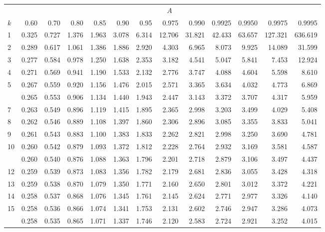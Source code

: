 \documentclass[
]{article}
\begin{document}
\begin{table}[H]
\centering
\begin{tabular}{lrrrrrrrrrrrr}
\toprule
\multicolumn{1}{c}{ } & \multicolumn{12}{c}{$A$} \\
\cmidrule(l{3pt}r{3pt}){2-13}
$k$ & 0.60 & 0.70 & 0.80 & 0.85 & 0.90 & 0.95 & 0.975 & 0.990 & 0.9925 & 0.9950 & 0.9975 & 0.9995\\
\midrule
1 & 0.325 & 0.727 & 1.376 & 1.963 & 3.078 & 6.314 & 12.706 & 31.821 & 42.433 & 63.657 & 127.321 & 636.619\\
2 & 0.289 & 0.617 & 1.061 & 1.386 & 1.886 & 2.920 & 4.303 & 6.965 & 8.073 & 9.925 & 14.089 & 31.599\\
3 & 0.277 & 0.584 & 0.978 & 1.250 & 1.638 & 2.353 & 3.182 & 4.541 & 5.047 & 5.841 & 7.453 & 12.924\\
4 & 0.271 & 0.569 & 0.941 & 1.190 & 1.533 & 2.132 & 2.776 & 3.747 & 4.088 & 4.604 & 5.598 & 8.610\\
5 & 0.267 & 0.559 & 0.920 & 1.156 & 1.476 & 2.015 & 2.571 & 3.365 & 3.634 & 4.032 & 4.773 & 6.869\\
\addlinespace
6 & 0.265 & 0.553 & 0.906 & 1.134 & 1.440 & 1.943 & 2.447 & 3.143 & 3.372 & 3.707 & 4.317 & 5.959\\
7 & 0.263 & 0.549 & 0.896 & 1.119 & 1.415 & 1.895 & 2.365 & 2.998 & 3.203 & 3.499 & 4.029 & 5.408\\
8 & 0.262 & 0.546 & 0.889 & 1.108 & 1.397 & 1.860 & 2.306 & 2.896 & 3.085 & 3.355 & 3.833 & 5.041\\
9 & 0.261 & 0.543 & 0.883 & 1.100 & 1.383 & 1.833 & 2.262 & 2.821 & 2.998 & 3.250 & 3.690 & 4.781\\
10 & 0.260 & 0.542 & 0.879 & 1.093 & 1.372 & 1.812 & 2.228 & 2.764 & 2.932 & 3.169 & 3.581 & 4.587\\
\addlinespace
11 & 0.260 & 0.540 & 0.876 & 1.088 & 1.363 & 1.796 & 2.201 & 2.718 & 2.879 & 3.106 & 3.497 & 4.437\\
12 & 0.259 & 0.539 & 0.873 & 1.083 & 1.356 & 1.782 & 2.179 & 2.681 & 2.836 & 3.055 & 3.428 & 4.318\\
13 & 0.259 & 0.538 & 0.870 & 1.079 & 1.350 & 1.771 & 2.160 & 2.650 & 2.801 & 3.012 & 3.372 & 4.221\\
14 & 0.258 & 0.537 & 0.868 & 1.076 & 1.345 & 1.761 & 2.145 & 2.624 & 2.771 & 2.977 & 3.326 & 4.140\\
15 & 0.258 & 0.536 & 0.866 & 1.074 & 1.341 & 1.753 & 2.131 & 2.602 & 2.746 & 2.947 & 3.286 & 4.073\\
\addlinespace
16 & 0.258 & 0.535 & 0.865 & 1.071 & 1.337 & 1.746 & 2.120 & 2.583 & 2.724 & 2.921 & 3.252 & 4.015\\

\end{tabular}
\end{table}
\end{document}
